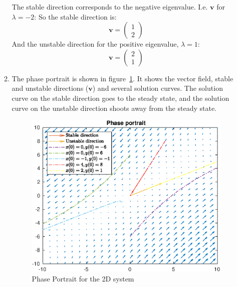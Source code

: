 \documentclass{/home/janmebows/Documents/LatexTemplates/myassignment}
\begin{document}
\begin{enumerate}
\begin{enumerate}
		The stable direction corresponds to the negative eigenvalue. I.e. $\mathbf{v}$ for $\lambda = -2$:
		So the stable direction is:
		\[\mathbf{v} = \begin{pmatrix}1\\2\end{pmatrix}\]
		And the unstable direction for the positive eigenvalue, $\lambda = 1$:
		\[\mathbf{v} = \begin{pmatrix}2\\1\end{pmatrix}\]
		\item %
		The phase portrait is shown in figure~\ref{fig:phaseportrait1}. It shows the vector field, stable and unstable directions ($\mathbf{v}$) and several solution curves. The solution curve on the stable direction goes to the steady state, and the solution curve on the unstable direction shoots away from the steady state.

		\begin{figure}[h]
			\centering
			\label{fig:phaseportrait1}
			\includegraphics[width=\linewidth]{ODEsA3Q1f}
			\caption{Phase Portrait for the 2D system}
		\end{figure}


\end{enumerate}
\end{enumerate}
\end{document}
